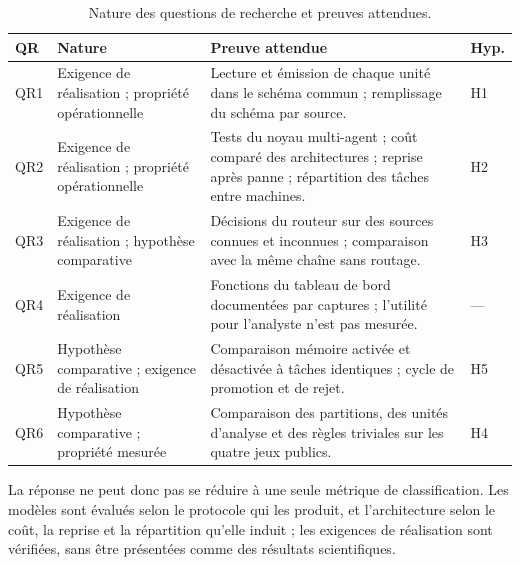 \begin{table}[H]
\centering
\caption{Nature des questions de recherche et preuves attendues.}
\label{tab:nature-qr}
\small
\begin{tabularx}{\textwidth}{p{} p{} X p{}}
\toprule
\textbf{QR} & \textbf{Nature} & \textbf{Preuve attendue} & \textbf{Hyp.} \\
\midrule
QR1 & Exigence de réalisation ; propriété opérationnelle & Lecture et émission de chaque unité dans le schéma commun ; remplissage du schéma par source. & H1 \\
QR2 & Exigence de réalisation ; propriété opérationnelle & Tests du noyau multi-agent ; coût comparé des architectures ; reprise après panne ; répartition des tâches entre machines. & H2 \\
QR3 & Exigence de réalisation ; hypothèse comparative & Décisions du routeur sur des sources connues et inconnues ; comparaison avec la même chaîne sans routage. & H3 \\
QR4 & Exigence de réalisation & Fonctions du tableau de bord documentées par captures ; l'utilité pour l'analyste n'est pas mesurée. & --- \\
QR5 & Hypothèse comparative ; exigence de réalisation & Comparaison mémoire activée et désactivée à tâches identiques ; cycle de promotion et de rejet. & H5 \\
QR6 & Hypothèse comparative ; propriété mesurée & Comparaison des partitions, des unités d'analyse et des règles triviales sur les quatre jeux publics. & H4 \\
\bottomrule
\end{tabularx}
\end{table}

La réponse ne peut donc pas se réduire à une seule métrique de classification. Les modèles sont évalués selon le protocole qui les produit, et l'architecture selon le coût, la reprise et la répartition qu'elle induit ; les exigences de réalisation sont vérifiées, sans être présentées comme des résultats scientifiques.
